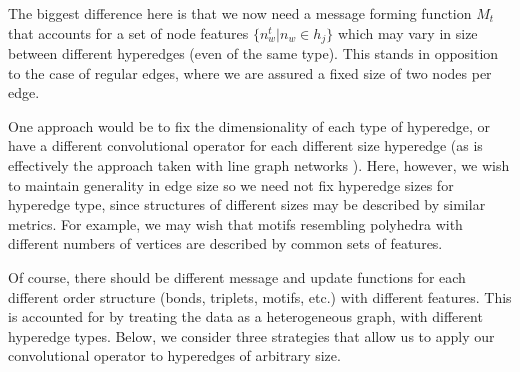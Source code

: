 \documentclass[10pt,a4paper,twocolumn]{article}
\begin{document}

The biggest difference here is that we now need a message forming function $M_t$ that accounts for a set of node features $\lbrace n_w^t \vert n_w \in h_j \rbrace$ which may vary in size between different hyperedges (even of the same type). This stands in opposition to the case of regular edges, where we are assured a fixed size of two nodes per edge. 

One approach would be to fix the dimensionality of each type of hyperedge, or have a different convolutional operator for each different size hyperedge (as is effectively the approach taken with line graph networks \cite{linegraph_general}). Here, however, we wish to maintain generality in edge size so we need not fix hyperedge sizes for hyperedge type, since structures of different sizes may be described by similar metrics. For example, we may wish that motifs resembling polyhedra with different numbers of vertices are described by common sets of features.



Of course, there should be different message and update functions for each different order structure (bonds, triplets, motifs, etc.) with different features. This is accounted for by treating the data as a heterogeneous graph, with different hyperedge types. Below, we consider three strategies that allow us to apply our convolutional operator to hyperedges of arbitrary size.
\end{document}
